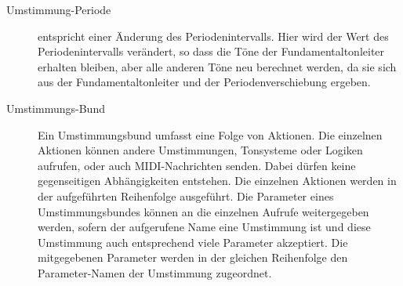 \begin{description}
      

      

  \item[Umstimmung-Periode]
      entspricht einer Änderung des
      Periodenintervalls.
      Hier wird der Wert des
      Periodenintervalls verändert, so dass die Töne der Fundamentaltonleiter
      erhalten bleiben, aber alle anderen Töne neu berechnet werden,
      da sie sich aus der Fundamentaltonleiter und der Periodenverschiebung
      ergeben.

      



  \item[Umstimmungs-Bund]
      Ein Umstimmungsbund umfasst eine Folge von
      Aktionen. Die einzelnen
      Aktionen können andere Umstimmungen,
      Tonsysteme oder Logiken aufrufen, oder auch MIDI-Nachrichten
      senden. Dabei dürfen keine gegenseitigen
      Abhängigkeiten entstehen. Die einzelnen Aktionen werden in der
      aufgeführten Reihenfolge ausgeführt.
      Die Parameter eines
      Umstimmungsbundes können an die einzelnen Aufrufe weitergegeben
      werden, sofern der aufgerufene Name eine Umstimmung ist und
      diese Umstimmung auch entsprechend viele Parameter akzeptiert.
      Die mitgegebenen Parameter werden in der gleichen Reihenfolge
      den Parameter-Namen der Umstimmung zugeordnet.


      

      

      

      



\end{description}
